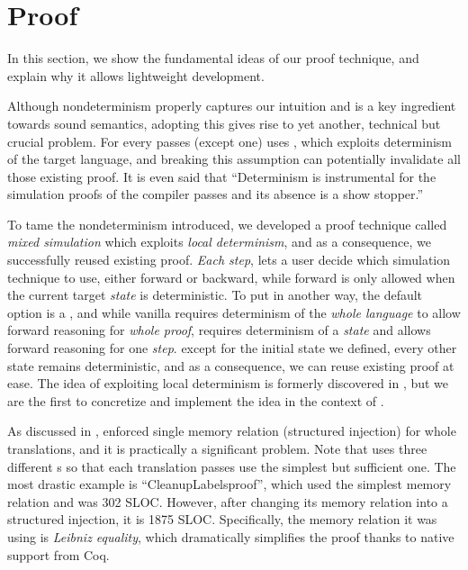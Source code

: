 {\section{Proof}\label{sec:overview:proof}

In this section, we show the fundamental ideas of our proof technique, and explain why it allows lightweight development.

Although nondeterminism properly captures our intuition and is a key ingredient towards sound semantics, adopting this gives rise to yet another, technical but crucial problem.
For every passes (except one) \cc{} uses \fsim{}, which exploits determinism of the target language, and breaking this assumption can potentially invalidate all those existing proof.
It is even said that ``Determinism is instrumental for the simulation proofs of the compiler passes and its absence is a show stopper.'' \cite{besson:intptr}


To tame the nondeterminism introduced, we developed a proof technique called \textit{mixed simulation} which exploits \textit{local determinism}, and as a consequence, we successfully reused existing proof.
\textit{Each step}, \xsim{} lets a user decide which simulation technique to use, either forward or backward, while forward is only allowed when the current target \textit{state} is deterministic.
To put in another way, the default option is a \bsim{}, and while vanilla \fsim{} requires determinism of the \textit{whole language} to allow forward reasoning for \textit{whole proof}, \xsim{} requires determinism of a \textit{state} and allows forward reasoning for one \textit{step}.
\nb{} except for the initial state we defined, every other state remains deterministic, and as a consequence, we can reuse existing proof at ease.
The idea of exploiting local determinism is formerly discovered in \cite{neis:pilsner}, but we are the first to concretize and implement the idea in the context of \cc{}. 



As discussed in , \ccc{} enforced single memory relation (structured injection) for whole translations, and it is practically a significant problem. %
Note that \cc{} uses three different \mrel{}s so that each translation passes use the simplest but sufficient one.
The most drastic example is ``CleanupLabelsproof'', which used the simplest memory relation and was 302 SLOC.
However, after changing its memory relation into a structured injection, it is 1875 SLOC.
Specifically, the memory relation it was using is \textit{Leibniz equality}, which dramatically simplifies the proof thanks to native support from Coq.

}
